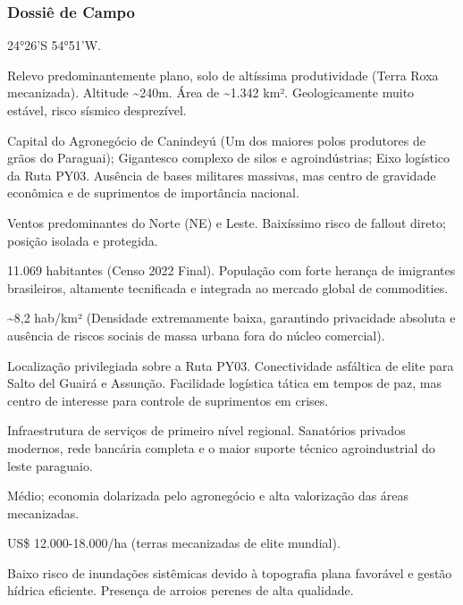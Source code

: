 \subsubsection{Dossiê de Campo}
\begin{description}[style=nextline,leftmargin=0.5cm,font=\bfseries]
\item[Coordenadas]  24°26'S 54°51'W.
\item[Topografia]  Relevo predominantemente plano, solo de altíssima produtividade (Terra Roxa mecanizada). Altitude \textasciitilde 240m. Área de \textasciitilde 1.342 km². Geologicamente muito estável, risco sísmico desprezível.
\item[Alvos Estratégicos]  Capital do Agronegócio de Canindeyú (Um dos maiores polos produtores de grãos do Paraguai); Gigantesco complexo de silos e agroindústrias; Eixo logístico da Ruta PY03. Ausência de bases militares massivas, mas centro de gravidade econômica e de suprimentos de importância nacional.
\item[Fallout]  Ventos predominantes do Norte (NE) e Leste. Baixíssimo risco de fallout direto; posição isolada e protegida.
\item[População]  11.069 habitantes (Censo 2022 Final). População com forte herança de imigrantes brasileiros, altamente tecnificada e integrada ao mercado global de commodities.
\item[Densidade]  \textasciitilde 8,2 hab/\allowbreak km² (Densidade extremamente baixa, garantindo privacidade absoluta e ausência de riscos sociais de massa urbana fora do núcleo comercial).
\item[Vias de Acesso]  Localização privilegiada sobre a Ruta PY03. Conectividade asfáltica de elite para Salto del Guairá e Assunção. Facilidade logística tática em tempos de paz, mas centro de interesse para controle de suprimentos em crises.
\item[Serviços]  Infraestrutura de serviços de primeiro nível regional. Sanatórios privados modernos, rede bancária completa e o maior suporte técnico agroindustrial do leste paraguaio.
\item[Custo de Vida]  Médio; economia dolarizada pelo agronegócio e alta valorização das áreas mecanizadas.
\item[Preço da Terra]  US\$ 12.000-18.000/\allowbreak ha (terras mecanizadas de elite mundial).
\item[Hidrologia]  Baixo risco de inundações sistêmicas devido à topografia plana favorável e gestão hídrica eficiente. Presença de arroios perenes de alta qualidade.

\end{description}
